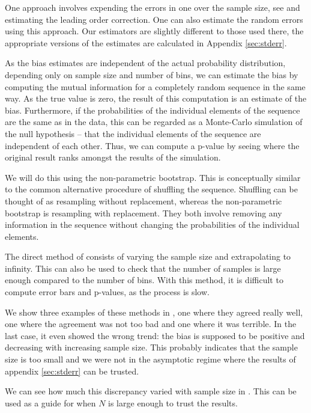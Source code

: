 \documentclass[12pt]{article}
\begin{document}
One approach involves expending the errors in one over the sample size, see \cite{1999PhyD..125..285R} and estimating the leading order correction. One can also estimate the random errors using this approach. Our estimators are slightly different to those used there, the appropriate versions of the estimates are calculated in Appendix \ref{sec:stderr}.

As the bias estimates are independent of the actual probability distribution, depending only on sample size and number of bins, we can estimate the bias by computing the mutual information for a completely random sequence in the same way. As the true value is zero, the result of this computation is an estimate of the bias. Furthermore, if the probabilities of the individual elements of the sequence are the same as in the data, this can be regarded as a Monte-Carlo simulation of the null hypothesis -- that the individual elements of the sequence are independent of each other. Thus, we can compute a p-value by seeing where the original result ranks amongst the results of the simulation.

We will do this using the non-parametric bootstrap. This is conceptually similar to the common alternative procedure of shuffling the sequence. Shuffling can be thought of as resampling without replacement, whereas the non-parametric bootstrap is resampling with replacement. They both involve removing any information in the sequence without changing the probabilities of the individual elements.

The direct method of \cite{1998PhRvL..80..197S} consists of varying the sample size and extrapolating to infinity. This can also be used to check that the number of samples is large enough compared to the number of bins. With this method, it is difficult to compute error bars and p-values, as the process is slow.

We show three examples of these methods in , one where they agreed really well, one where the agreement was not too bad and one where it was terrible. In the last case, it even showed the wrong trend: the bias is supposed to be positive and decreasing with increasing sample size. This probably indicates that the sample size is too small and we were not in the asymptotic regime where the results of appendix \ref{sec:stderr} can be trusted.

We can see how much this discrepancy varied with sample size in . This can be used as a guide for when $N$ is large enough to trust the results.
\end{document}
